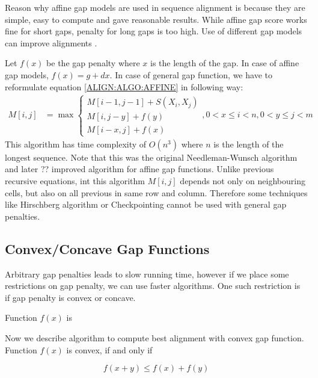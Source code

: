 Reason why affine gap models are used in sequence alignment is because they are
simple, easy to compute and gave reasonable results. While affine gap score
works fine for short gaps, penalty for long gaps is too high. Use of different 
gap models can improve alignments \cite{Gill2004,Cartwright2009}.

Let $f(x)$ be the gap penalty where $x$ is the length of the gap. In case of
affine gap models, $f(x)=g+dx$. In case of general gap function, we have to
reformulate equation \ref{ALIGN:ALGO:AFFINE} in following way:
\begin{align}
M[i,j] &= \max
\begin{cases}
 M[i-1,j-1]+S(X_i,X_j)\\
 M[i,j-y]+f(y)\\
 M[i-x,j]+f(x)
\end{cases}, 0<x\leq i<n,0<y\leq j<m
\end{align}
This algorithm has time complexity of $O(n^3)$ where $n$ is the length of the
longest sequence. Note that this was the original Needleman-Wunsch\cite{}
algorithm and later ?? improved algorithm for affine gap functions\cite{}.
Unlike previous recursive equations, int this algorithm $M[i,j]$ depends not
only on neighbouring cells, but also on all previous in same row and column.
Therefore some techniques like Hirschberg algorithm or Checkpointing cannot be
used with general gap penalties.

\subsection{Convex/Concave Gap Functions}

Arbitrary gap penalties leads to slow running time, however if we place some
restrictions on gap penalty, we can use faster algorithms. One such restriction
is if gap penalty is convex or concave.

\begin{definition}
Function $f(x)$ is 
\end{definition}

Now we describe algorithm to compute best alignment with convex gap function.
Function $f(x)$ is convex, if and only if

\[f(x+y)\leq f(x)+f(y)\]
 




